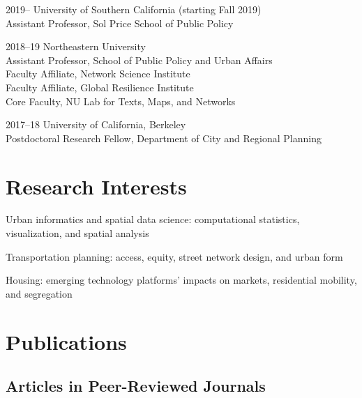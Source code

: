 \documentclass[12pt,letterpaper]{report}
\newcommand{\listitemspace}{0.15em}
\renewenvironment{itemize}
{\begin{list}{}{\setlength{\leftmargin}{0em}
			\setlength{\parskip}{0em}
			\setlength{\itemsep}{\listitemspace}
			\setlength{\parsep}{\listitemspace}}}
	{\end{list}}
\begin{document}
	\begin{tablist}

		\item[2019--] 	\tab University of Southern California (starting Fall 2019) \\
							 Assistant Professor, Sol Price School of Public Policy

		\item[2018--19] \tab Northeastern University \\
							 Assistant Professor, School of Public Policy and Urban Affairs \\
							 Faculty Affiliate, Network Science Institute \\
							 Faculty Affiliate, Global Resilience Institute \\
							 Core Faculty, NU Lab for Texts, Maps, and Networks

		\item[2017--18] \tab University of California, Berkeley \\
							 Postdoctoral Research Fellow, Department of City and Regional Planning

	\end{tablist}



	\section*{Research Interests}

	\begin{itemize}

		\item Urban informatics and spatial data science: computational statistics, visualization, and spatial analysis

		\item Transportation planning: access, equity, street network design, and urban form

		\item Housing: emerging technology platforms' impacts on markets, residential mobility, and segregation

	\end{itemize}



	\section*{Publications}

	\subsection*{Articles in Peer-Reviewed Journals}
\end{document}
